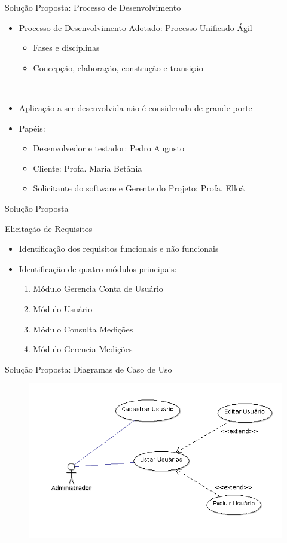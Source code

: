 \begin{frame}{Solução Proposta: Processo de Desenvolvimento}
\begin{itemize}
	\item Processo de Desenvolvimento Adotado: \alert{Processo Unificado Ágil}
	\begin{itemize}
		\item Fases e disciplinas
		\item Concepção, elaboração, construção e transição
	\end{itemize}
	\ \ \newline
	\item Aplicação a ser desenvolvida não é considerada de grande porte
	\ \ \newline
	\item Papéis:
	\begin{itemize}
		\item Desenvolvedor e testador: Pedro Augusto
		\item Cliente: Profa. Maria Betânia
		\item Solicitante do software e Gerente do Projeto: Profa. Elloá
	\end{itemize}
\end{itemize}
\end{frame}

\begin{frame}{Solução Proposta}
\begin{block}{Elicitação de Requisitos}
\begin{itemize}
	\item Identificação dos requisitos funcionais e não funcionais
	\item Identificação de quatro módulos principais:
	\begin{enumerate}
		\item Módulo Gerencia Conta de Usuário
		\item Módulo Usuário
		\item Módulo Consulta Medições
		\item Módulo Gerencia Medições
	\end{enumerate}
\end{itemize}
\end{block}

\end{frame}

\begin{frame}{Solução Proposta: Diagramas de Caso de Uso}
\begin{figure}[h!]
\centering
\includegraphics[width=0.8\linewidth]{./img/uc001}
\end{figure}
\end{frame}

